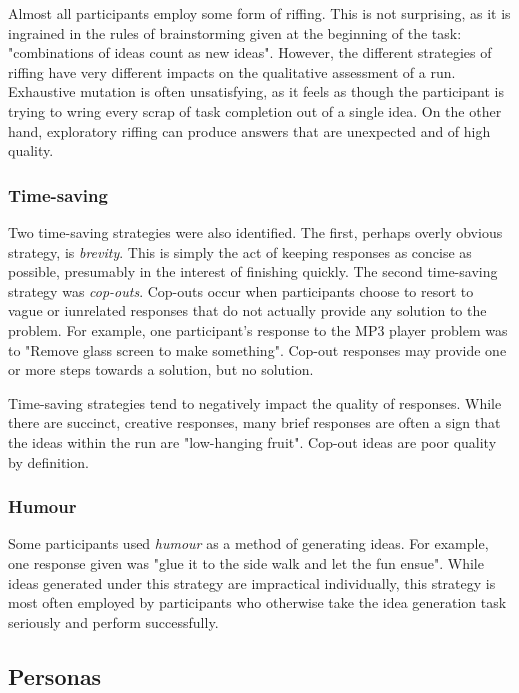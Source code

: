 Almost all participants employ some form of riffing. This is not surprising, as it is ingrained in the rules of brainstorming given at the beginning of the task: "combinations of ideas count as new ideas". However, the different strategies of riffing have very different impacts on the qualitative assessment of a run. Exhaustive mutation is often unsatisfying, as it feels as though the participant is trying to wring every scrap of task completion out of a single idea. On the other hand, exploratory riffing can produce answers that are unexpected and of high quality. 

\subsubsection{Time-saving}

Two time-saving strategies were also identified. The first, perhaps overly obvious strategy, is \emph{brevity}. This is simply the act of keeping responses as concise as possible, presumably in the interest of finishing quickly. The second time-saving strategy was \emph{cop-outs}. Cop-outs occur when participants choose to resort to vague or iunrelated responses that do not actually provide any solution to the problem. For example, one participant's response to the MP3 player problem was to "Remove glass screen to make something". Cop-out responses may provide one or more steps towards a solution, but no solution.

Time-saving strategies tend to negatively impact the quality of responses. While there are succinct, creative responses, many brief responses are often a sign that the ideas within the run are "low-hanging fruit". Cop-out ideas are poor quality by definition.

\subsubsection{Humour}

Some participants used \emph{humour} as a method of generating ideas. For example, one response given was "glue it to the side walk and let the fun ensue". While ideas generated under this strategy are impractical individually, this strategy is most often employed by participants who otherwise take the idea generation task seriously and perform successfully.

\subsection{Personas}

